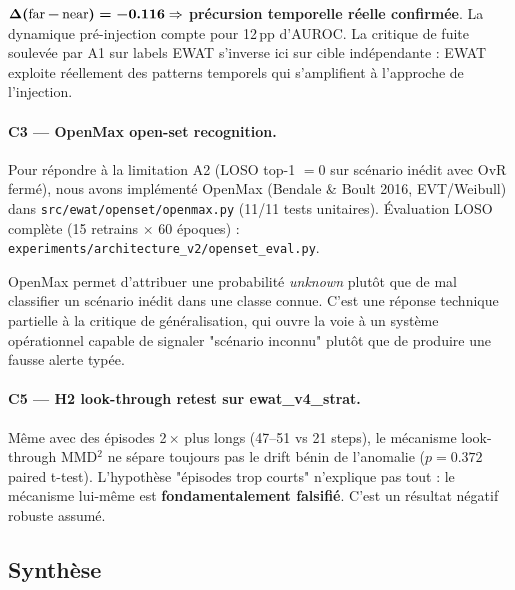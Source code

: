 $\boldsymbol{\Delta($far\,$-$\,near$) = -0.116} \Rightarrow$ \textbf{précursion temporelle
réelle confirmée}. La dynamique pré-injection compte pour 12\,pp d'AUROC. La critique de fuite
soulevée par A1 sur labels EWAT s'inverse ici sur cible indépendante : EWAT exploite réellement
des patterns temporels qui s'amplifient à l'approche de l'injection.

\paragraph{C3 --- OpenMax open-set recognition.}
Pour répondre à la limitation A2 (LOSO top-1 $= 0$ sur scénario inédit avec OvR fermé), nous avons
implémenté OpenMax (Bendale \& Boult 2016, EVT/Weibull) dans \texttt{src/ewat/openset/openmax.py}
(11/11 tests unitaires). Évaluation LOSO complète (15 retrains $\times$ 60 époques) :
\texttt{experiments/architecture\_v2/openset\_eval.py}.

OpenMax permet d'attribuer une probabilité \emph{unknown} plutôt que de mal classifier
un scénario inédit dans une classe connue. C'est une réponse technique partielle à la critique
de généralisation, qui ouvre la voie à un système opérationnel capable de signaler "scénario
inconnu" plutôt que de produire une fausse alerte typée.

\paragraph{C5 --- H2 look-through retest sur ewat\_v4\_strat.}
Même avec des épisodes 2\,$\times$ plus longs (47--51 vs 21 steps), le mécanisme look-through
MMD$^2$ ne sépare toujours pas le drift bénin de l'anomalie ($p = 0.372$ paired t-test).
L'hypothèse "épisodes trop courts" n'explique pas tout : le mécanisme lui-même est
\textbf{fondamentalement falsifié}. C'est un résultat négatif robuste assumé.

\subsection{Synthèse}

